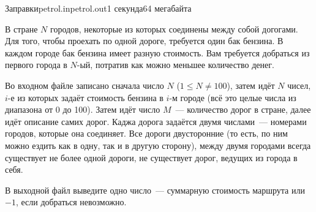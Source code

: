 \begin{problem}{Заправки}{petrol.in}{petrol.out}{1 секунда}{64 мегабайта}

В стране $N$ городов, некоторые из которых соединены между собой догогами.
Для того, чтобы проехать по одной дороге, требуется один бак бензина.
В каждом городе бак бензина имеет разную стоимость. Вам требуется добраться из первого города в $N$-ый, потратив как можно меньшее количество денег.

\InputFile

Во входном файле записано сначала число $N$ ($1 \le N \ne 100$), 
затем идёт $N$ чисел, $i$-е из которых
задаёт стоимость бензина в $i$-м городе
(всё это целые числа из диапазона от 0 до 100).
Затем идёт число $M$~--- количество дорог в стране, далее идёт описание самих
дорог.
Каджа дорога задаётся двумя числами~--- номерами городов, которые она соединяет.
Все дороги двусторонние (то есть, по ним можно ездить как в одну,
так и в другую сторону), между двумя городами всегда существует не более одной
дороги, не существует дорог, ведущих из города в себя.

\OutputFile

В выходной файл выведите одно число~--- суммарную стоимость маршрута или $-1$,
если добраться невозможно.

\Example

\begin{example}
%
%
\end{example}

\end{problem}

